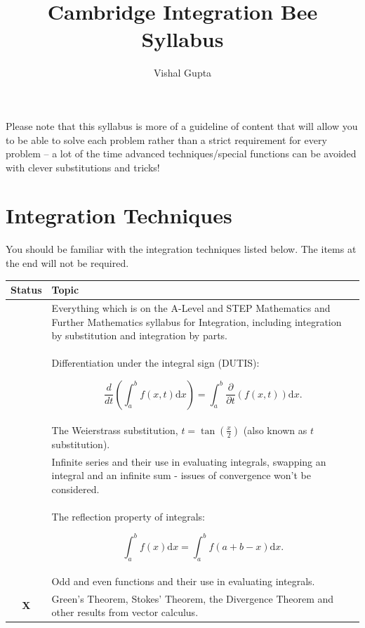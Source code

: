 \documentclass[11pt]{scrartcl}
\providecommand{\isRq}{{\color{green!60!black}\CheckmarkBold}}
\providecommand{\isUs}{{\color{cyan}\sffamily\bfseries O}}
\providecommand{\isAv}{{\color{gray}\sffamily\bfseries !!}}
\providecommand{\isEx}{{\color{red}\sffamily\bfseries X}}
\begin{document}
\title{Cambridge Integration Bee Syllabus}
\author{Vishal Gupta}
\maketitle

Please note that this syllabus is more of a guideline of content that will allow you to be able to solve each problem rather than a strict requirement for every problem -- a lot of the time advanced techniques/special functions can be avoided with clever substitutions and tricks!

\section{Integration Techniques}

You should be familiar with the integration techniques listed below. The items at the end will not be required.

\begin{center}
	\begin{tabular}{cp{12cm}}
	\toprule Status & Topic \\ \midrule
	\isRq & Everything which is on the A-Level and STEP Mathematics and Further Mathematics syllabus for Integration, including integration by substitution and integration by parts. \\
	\isRq & Differentiation under the integral sign (DUTIS): 
	
	$$\frac{d}{d t}\left(\int_{a}^{b} f(x, t) \mathrm{d} x\right)=\int_{a}^{b} \frac{\partial}{\partial t}(f(x, t)) \mathrm{d} x.$$ \\
	\isRq & The Weierstrass substitution, $t=\tan \left(\frac{x}{2}\right)$ (also known as $t$ substitution). \\
	\isRq & Infinite series and their use in evaluating integrals, swapping an integral and an infinite sum - issues of convergence won't be considered. \\
	\isRq & The reflection property of integrals:

	$$
	\int_{a}^{b} f(x) \mathrm{d} x=\int_{a}^{b} f(a+b-x) \mathrm{d} x.
	$$ \\
	\isRq & Odd and even functions and their use in evaluating integrals.\\
	\isEx & Green's Theorem, Stokes' Theorem, the Divergence Theorem and other results from vector calculus. \\
	\bottomrule
	\end{tabular}
\end{center} 
\end{document}
